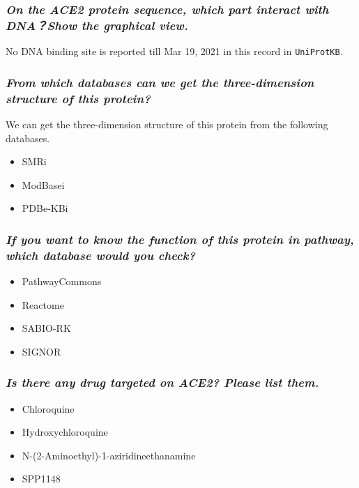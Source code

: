 \documentclass[en,black,11pt,normal]{elegantnote}
\begin{document}
\subsubsection{\textit{On the ACE2 protein sequence, which part interact with DNA？Show the graphical view.}}

No DNA binding site is reported till Mar 19, 2021 in this record in \texttt{UniProtKB}.

\subsubsection{\textit{From which databases can we get the three-dimension structure of this protein?}}
We can get the three-dimension structure of this protein from the following databases.
\begin{itemize} 
    \item SMRi
    \item ModBasei
    \item PDBe-KBi
\end{itemize}

\subsubsection{\textit{If you want to know the function of this protein in pathway, which database would you check?}}

\begin{itemize} 
    \item PathwayCommons
    \item Reactome
    \item SABIO-RK
    \item SIGNOR
\end{itemize}

\subsubsection{\textit{Is there any drug targeted on ACE2? Please list them.}}

\begin{itemize} 
    \item Chloroquine
    \item Hydroxychloroquine
    \item N-(2-Aminoethyl)-1-aziridineethanamine
    \item SPP1148
\end{itemize}


{}
\end{document}
